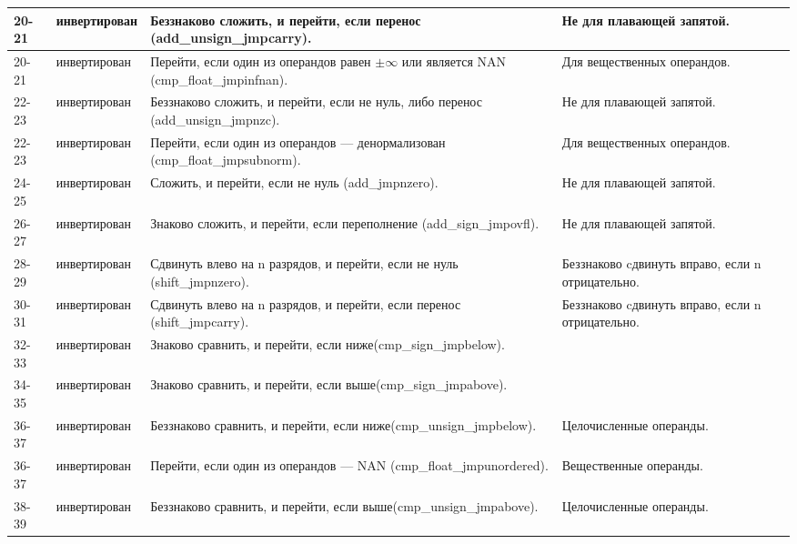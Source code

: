\documentclass[forwardcom.tex]{subfiles}
\begin{document}
\begin{longtable}{|p{10mm}|p{18mm}|p{80mm}|p{35mm}|}
20-21 & ин\-вер\-ти\-ро\-ван    & Беззнаково сложить, и перейти, если перенос (add\_unsign\_jmpcarry).         & Не для плавающей запятой. \\ \hline
20-21 & ин\-вер\-ти\-ро\-ван    & Перейти, если один из операндов равен $\pm\infty$ или является NAN (cmp\_float\_jmpinfnan). & Для вещественных операндов. \\ \hline
22-23 & ин\-вер\-ти\-ро\-ван    & Беззнаково сложить, и перейти, если не нуль, либо перенос (add\_unsign\_jmpnzc). & Не для плавающей запятой. \\ \hline
22-23 & ин\-вер\-ти\-ро\-ван    & Перейти, если один из операндов --- денормализован (cmp\_float\_jmpsubnorm). & Для вещественных операндов. \\ \hline
24-25 & ин\-вер\-ти\-ро\-ван    & Сложить, и перейти, если не нуль (add\_jmpnzero).                            & Не для плавающей запятой. \\ \hline
26-27 & ин\-вер\-ти\-ро\-ван    & Знаково сложить, и перейти, если переполнение (add\_sign\_jmpovfl).          & Не для плавающей запятой.  \\ \hline
28-29 &  ин\-вер\-ти\-ро\-ван   & Сдвинуть влево на n разрядов, и перейти, если не нуль (shift\_jmpnzero).     & Беззнаково cдвинуть вправо, если n отрицательно. \\ \hline
30-31 & ин\-вер\-ти\-ро\-ван    & Сдвинуть влево на n разрядов, и перейти, если перенос (shift\_jmpcarry).     & Беззнаково cдвинуть вправо, если n отрицательно.  \\ \hline
32-33 & ин\-вер\-ти\-ро\-ван    & Знаково сравнить, и перейти, если ниже\newline (cmp\_sign\_jmpbelow).      &  \\ \hline
34-35 & ин\-вер\-ти\-ро\-ван    & Знаково сравнить, и перейти, если выше\newline (cmp\_sign\_jmpabove).      &  \\ \hline
36-37 & ин\-вер\-ти\-ро\-ван    & Беззнаково сравнить, и перейти, если ниже\newline (cmp\_unsign\_jmpbelow). & Целочисленные операнды. \\ \hline
36-37 & ин\-вер\-ти\-ро\-ван    & Перейти, если один из операндов --- NAN (cmp\_float\_jmpunordered).        & Вещественные операнды. \\ \hline
38-39 & ин\-вер\-ти\-ро\-ван    & Беззнаково сравнить, и перейти, если выше\newline (cmp\_unsign\_jmpabove). & Целочисленные операнды.  \\ \hline

\end{longtable}
\end{document}
